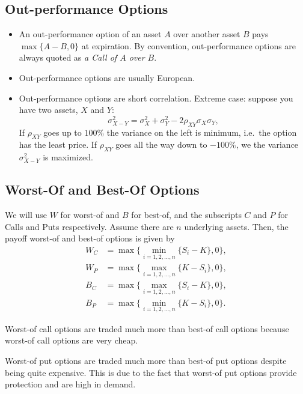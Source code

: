 \documentclass{amsart}
\theoremstyle{plain}
\numberwithin{equation}{section}
\begin{document}
\subsection{Out-performance Options}
\begin{itemize}
	\item An out-performance option of an asset $A$ over another asset $B$ pays
	$\max\{A-B, 0\}$ at expiration. By convention, out-performance options are always 
	quoted as \emph{a Call of $A$ over $B$}.
	
	\item Out-performance options are usually European.
	
	\item Out-performance options are short correlation. Extreme case: suppose you 
	have two assets, $X$ and $Y$:
	\begin{equation}
	\sigma^2_{X-Y} = \sigma^2_X + \sigma^2_Y - 2 \rho_{XY}\sigma_X\sigma_Y,
	\end{equation}
	If $\rho_{XY}$ goes up to $100\%$ the variance on the left is 
	minimum, i.e.\ the option has the least price. If $\rho_{XY}$ goes all the 
	way down to $-100\%$, we the variance $\sigma^2_{X-Y}$ is maximized.	
\end{itemize}

\subsection{Worst-Of and Best-Of Options}
We will use $W$ for worst-of and $B$ for 
best-of, and the subscripts $C$ and $P$ for 
Calls and Puts respectively. Assume there 
are $n$ underlying assets. Then, the payoff 
worst-of and best-of options is given by
\begin{align}
W_C &= \max\{\min_{i=1, 2, \ldots, n}\{S_i - K\}, 0\},\\
W_P &= \max\{\max_{i=1, 2, \ldots, n}\{K - S_i\}, 0\},\\
B_C &= \max\{\max_{i=1, 2, \ldots, n}\{S_i - K\}, 0\},\\
B_P &= \max\{\min_{i=1, 2, \ldots, n}\{K - S_i\}, 0\}.
\end{align}

Worst-of call options are traded much more than best-of call options because 
worst-of call options are very cheap. 

Worst-of put options are traded much more than best-of put options despite being
quite expensive. This is due to the fact that worst-of put options provide 
protection and are high in demand. 
\end{document}
